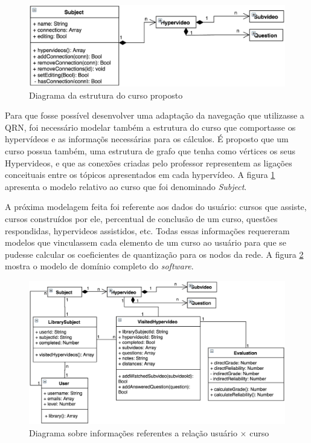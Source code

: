 \begin{figure}[h!]
	\centering
  	\includegraphics[width=.7\linewidth]{figuras/curso.eps}
  	\caption{Diagrama da estrutura do curso proposto}
  	\label{fig:curso}
\end{figure}

Para que fosse possível desenvolver uma adaptação da navegação que utilizasse a QRN, foi necessário modelar também a estrutura do curso que comportasse os hypervídeos e as informaçõs necessárias para os cálculos. É proposto que um curso possua também, uma estrutura de grafo que tenha como vértices os seus Hypervideos, e que as conexões criadas pelo professor representem as ligações conceituais entre os tópicos apresentados em cada hypervídeo. A figura \ref{fig:curso} apresenta o modelo relativo ao curso que foi denominado \textit{Subject}.

A próxima modelagem feita foi referente aos dados do usuário: cursos que assiste, cursos construídos por ele, percentual de conclusão de um curso, questões respondidas, hypervideos assistidos, etc. Todas essas informações requereram modelos que vinculassem cada elemento de um curso ao usuário para que se pudesse calcular os coeficientes de quantização para os nodos da rede. A figura \ref{fig:userdata} mostra o modelo de domínio completo do \textit{software}.

\begin{figure}[h!]
	\centering
  	\includegraphics[width=.8\linewidth]{figuras/userdata.eps}
  	\caption{Diagrama sobre informações referentes a relação usuário \(\times\) curso}
  	\label{fig:userdata}
\end{figure}

